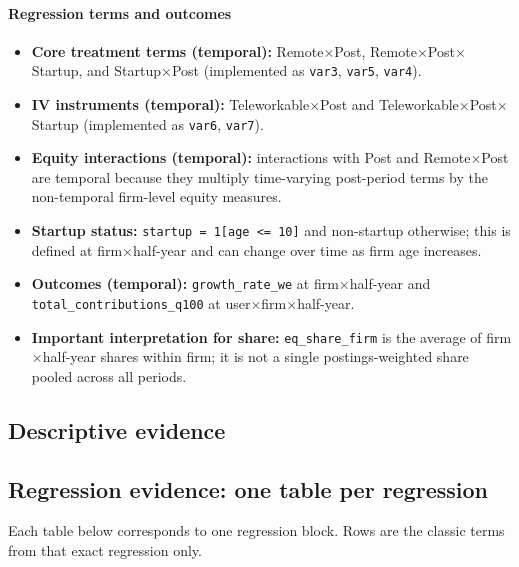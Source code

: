 \documentclass{article}
\newcommand{\cleanedresultsdir}{../../results/cleaned/tex}
\newcommand{\TableInput}[2][\linewidth]{}
\begin{document}
\paragraph{Regression terms and outcomes}
\begin{itemize}
  \item \textbf{Core treatment terms (temporal):} Remote$\times$Post, Remote$\times$Post$\times$Startup, and Startup$\times$Post (implemented as \texttt{var3}, \texttt{var5}, \texttt{var4}).
  \item \textbf{IV instruments (temporal):} Teleworkable$\times$Post and Teleworkable$\times$Post$\times$Startup (implemented as \texttt{var6}, \texttt{var7}).
  \item \textbf{Equity interactions (temporal):} interactions with Post and Remote$\times$Post are temporal because they multiply time-varying post-period terms by the non-temporal firm-level equity measures.
  \item \textbf{Startup status:} \texttt{startup = 1[age <= 10]} and non-startup otherwise; this is defined at firm$\times$half-year and can change over time as firm age increases.
  \item \textbf{Outcomes (temporal):} \texttt{growth\_rate\_we} at firm$\times$half-year and \texttt{total\_contributions\_q100} at user$\times$firm$\times$half-year.
  \item \textbf{Important interpretation for share:} \texttt{eq\_share\_firm} is the average of firm$\times$half-year shares within firm; it is not a single postings-weighted share pooled across all periods.
\end{itemize}

\subsection*{Descriptive evidence}
\begin{table}[H]
  \centering
  \caption{Sample accounting across matched and backfill modes}
  \TableInput{\cleanedresultsdir/llm_equity_cb_modes_sample_accounting.tex}
\end{table}

\begin{table}[H]
  \centering
  \caption{Startup vs non-startup equity prevalence and intensive margins}
  \TableInput{\cleanedresultsdir/llm_equity_cb_modes_descriptives.tex}
\end{table}

\subsection*{Regression evidence: one table per regression}
Each table below corresponds to one regression block. Rows are the classic terms from that exact regression only.
\end{document}
